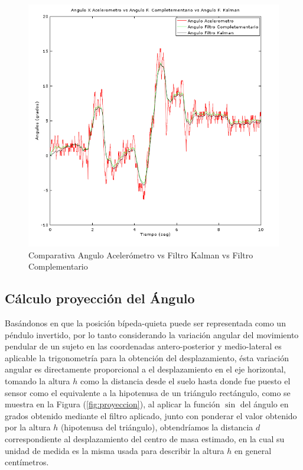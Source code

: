 \documentclass[12pt,a4paper]{article}
\begin{document}
\begin{figure}[H]
\centering
  \includegraphics[scale=0.7]{images/angKalCom}
  \caption{Comparativa Angulo Acelerómetro vs Filtro Kalman vs Filtro Complementario}
  \label{fig:AnguloXvsFiltros}
\end{figure}

\subsection{Cálculo proyección del Ángulo}
 Basándonos en que la posición bípeda-quieta puede ser representada como un péndulo invertido, por lo tanto considerando la variación angular del movimiento pendular de un sujeto en las coordenadas antero-posterior y medio-lateral es aplicable la trigonometría para la obtención del desplazamiento, ésta variación angular es directamente proporcional a el desplazamiento en el eje horizontal, tomando la altura $h$ como la distancia desde el suelo hasta donde fue puesto el sensor como el equivalente a la hipotenusa de un triángulo rectángulo, como se muestra en la Figura (\ref{fig:proyeccion}), al aplicar la función $\sin$ del ángulo en grados obtenido mediante el filtro aplicado, junto con ponderar el valor obtenido por la altura $h$ (hipotenusa del triángulo), obtendríamos la distancia $d$ correspondiente al desplazamiento del centro de masa estimado, en la cual su unidad de medida es la misma usada para describir la altura $h$ en general centímetros.
 
\end{document}
